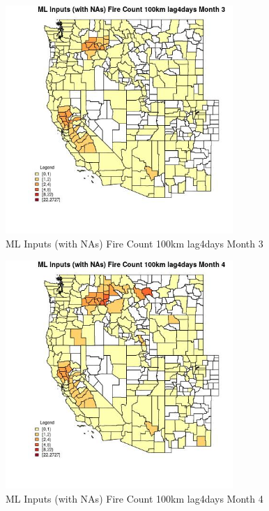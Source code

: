 \begin{figure} 
\centering  
\includegraphics[width=0.77\textwidth]{Code_Outputs/Report_ML_input_PM25_Step4_part_f_de_duplicated_aves_prioritize_24hr_obswNAs_CountyFire_Count_100km_lag4daysmedianMonth3.jpg} 
\caption{\label{fig:Report_ML_input_PM25_Step4_part_f_de_duplicated_aves_prioritize_24hr_obswNAsCountyFire_Count_100km_lag4daysmedianMonth3}ML Inputs (with NAs) Fire Count 100km lag4days Month 3} 
\end{figure} 
 

\begin{figure} 
\centering  
\includegraphics[width=0.77\textwidth]{Code_Outputs/Report_ML_input_PM25_Step4_part_f_de_duplicated_aves_prioritize_24hr_obswNAs_CountyFire_Count_100km_lag4daysmedianMonth4.jpg} 
\caption{\label{fig:Report_ML_input_PM25_Step4_part_f_de_duplicated_aves_prioritize_24hr_obswNAsCountyFire_Count_100km_lag4daysmedianMonth4}ML Inputs (with NAs) Fire Count 100km lag4days Month 4} 
\end{figure} 
 

